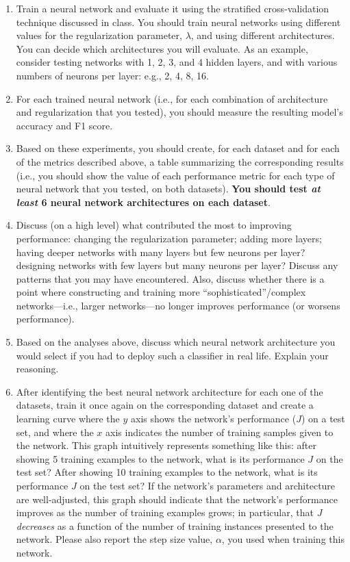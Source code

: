 \documentclass[letterpaper]{article}
\begin{document}
\begin{enumerate}
    \item Train a neural network and evaluate it using the stratified cross-validation technique discussed in class. You should train neural networks using different values for the regularization parameter, $\lambda$, and using different architectures. You can decide which architectures you will evaluate. As an example, consider testing networks with 1, 2, 3, and 4 hidden layers, and with various numbers of neurons per layer: e.g., 2, 4, 8, 16.
    \item For each trained neural network (i.e., for each combination of architecture and regularization that you tested), you should measure the resulting model's accuracy and F1 score. 
    \item Based on these experiments, you should create, for each dataset and for each of the metrics described above, a table summarizing the corresponding results (i.e., you should show the value of each performance metric for each type of neural network that you tested, on both datasets). \textbf{You should test \textit{at least} 6 neural network architectures on each dataset}.
    \item Discuss (on a high level) what contributed the most to improving performance: changing the regularization parameter; adding more layers; having deeper networks with many layers but few neurons per layer? designing networks with few layers but many neurons per layer? Discuss any patterns that you may have encountered. Also, discuss whether there is a point where constructing and training more ``sophisticated''/complex networks---i.e., larger networks---no longer improves performance (or worsens performance).
    \item Based on the analyses above,  discuss which neural network architecture you would select if you had to deploy such a classifier in real life. Explain your reasoning.     
    \item After identifying the best neural network architecture for each one of the datasets, train it once again on the corresponding dataset and create a learning curve where the $y$ axis shows the network's performance ($J$) on a test set, and where the $x$ axis indicates the number of training samples given to the network. This graph intuitively represents something like this: after showing 5 training examples to the network, what is its performance $J$ on the test set? After showing 10 training examples to the network, what is its performance $J$ on the test set? If the network's parameters and architecture are well-adjusted, this graph should indicate that the network's performance improves as the number of training examples grows; in particular, that $J$ \textit{decreases} as a function of the number of training instances presented to the network. Please also report the step size value, $\alpha$, you used when training this network.


\end{enumerate}
\end{document}
